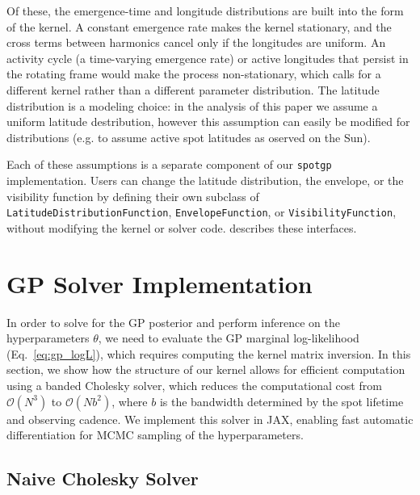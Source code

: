 \documentclass[preprint]{aastex702}
\newcommand{\code}[1]{{\texttt{#1}}}
\begin{document}
Of these, the emergence-time and longitude distributions are built into the form of the kernel. A constant emergence rate makes the kernel stationary, and the cross terms between harmonics cancel only if the longitudes are uniform. An activity cycle (a time-varying emergence rate) or active longitudes that persist in the rotating frame would make the process non-stationary, which calls for a different kernel rather than a different parameter distribution. The latitude distribution is a modeling choice: in the analysis of this paper we assume a uniform latitude destribution, however this assumption can easily be modified for distributions (e.g. to assume active spot latitudes as oserved on the Sun).

Each of these assumptions is a separate component of our \code{spotgp} implementation. Users can change the latitude distribution, the envelope, or the visibility function by defining their own subclass of \code{LatitudeDistributionFunction}, \code{EnvelopeFunction}, or \code{VisibilityFunction}, without modifying the kernel or solver code. \citet{birky_spotgp_2026} describes these interfaces.

\vspace{\baselineskip}
\section{GP Solver Implementation} \label{sec:gp_solver}

In order to solve for the GP posterior and perform inference on the hyperparameters $\theta$, we need to evaluate the GP marginal log-likelihood (Eq.~\ref{eq:gp_logL}), which requires computing the kernel matrix inversion. In this section, we show how the structure of our kernel allows for efficient computation using a banded Cholesky solver, which reduces the computational cost from $\mathcal{O}(N^3)$ to $\mathcal{O}(Nb^2)$, where $b$ is the bandwidth determined by the spot lifetime and observing cadence. We implement this solver in JAX, enabling fast automatic differentiation for MCMC sampling of the hyperparameters.

\subsection{Naive Cholesky Solver} 
\end{document}
